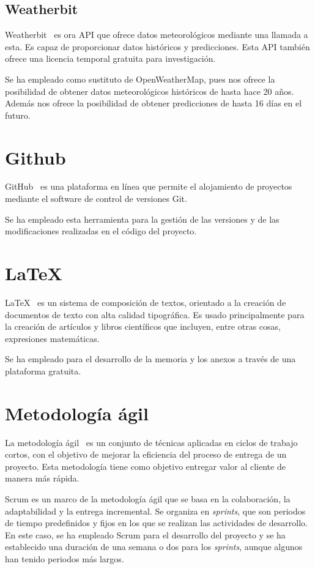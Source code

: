 \subsection{Weatherbit}

Weatherbit~\cite{weatherbit} es ora API que ofrece datos meteorológicos mediante una llamada a esta. Es capaz de proporcionar datos históricos y predicciones. Esta API también ofrece una licencia temporal gratuita para investigación.

\par

Se ha empleado como sustituto de OpenWeatherMap, pues nos ofrece la posibilidad de obtener datos meteorológicos históricos de hasta hace 20 años. Además nos ofrece la posibilidad de obtener predicciones de hasta 16 días en el futuro.

\section{Github}

GitHub~\cite{github:repo} es una plataforma en línea que permite el alojamiento de proyectos mediante el software de control de versiones Git.

Se ha empleado esta herramienta para la gestión de las versiones y de las modificaciones realizadas en el código del proyecto.

\section{\LaTeX}

\LaTeX ~\cite{wiki:latex} es un sistema de composición de textos, orientado a la creación de documentos de texto con alta calidad tipográfica. Es usado principalmente para la creación de artículos y libros científicos que incluyen, entre otras cosas, expresiones matemáticas. 

Se ha empleado para el desarrollo de la memoria y los anexos a través de una plataforma gratuita.

\section{Metodología ágil}

La metodología ágil~\cite{agile} es un conjunto de técnicas aplicadas en ciclos de trabajo cortos, con el objetivo de mejorar la eficiencia del proceso de entrega de un proyecto. Esta metodología tiene como objetivo entregar valor al cliente de manera más rápida.

\par

Scrum es un marco de la metodología ágil que se basa en la colaboración, la adaptabilidad y la entrega incremental. Se organiza en \textit{sprints}, que son periodos de tiempo predefinidos y fijos en los que se realizan las actividades de desarrollo. En este caso, se ha empleado Scrum para el desarrollo del proyecto y se ha establecido una duración de una semana o dos para los \textit{sprints}, aunque algunos han tenido periodos más largos.